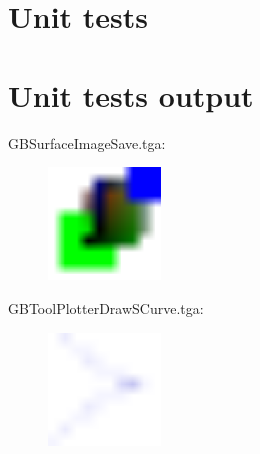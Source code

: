 \section{Unit tests}

\begin{scriptsize}
\begin{ttfamily}

\end{ttfamily}
\end{scriptsize}

\section{Unit tests output}

\begin{scriptsize}
\begin{ttfamily}

\end{ttfamily}
\end{scriptsize}

GBSurfaceImageSave.tga:\\
\begin{center}
\begin{figure}[H]
\centering\includegraphics[width=3cm]{./GBSurfaceImageSave.png}\\
\end{figure}
\end{center}

GBToolPlotterDrawSCurve.tga:\\
\begin{center}
\begin{figure}[H]
\centering\includegraphics[width=3cm]{./GBToolPlotterDrawSCurve.png}\\
\end{figure}
\end{center}

